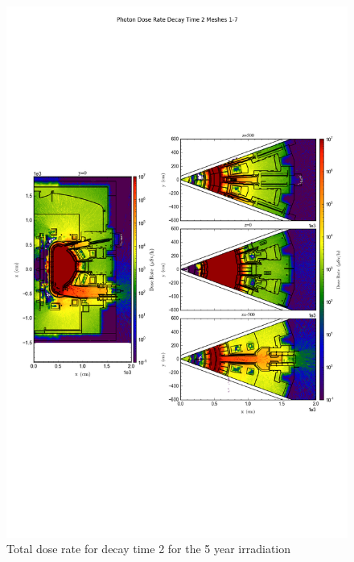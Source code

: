 \documentclass[12pt]{article}
\begin{document}
\begin{figure}[ht!]
\centering
\includegraphics[trim={0cm 8cm, 0cm 8cm},clip,scale=0.75]{../plots/final_model/5year/Photon_Dose_Rate_Decay_Time_2_Meshes_1-7.png}
\caption{Total dose rate for decay time 2 for the 5 year irradiation}
\label{fig:photons_5y_dc2_nob4c_dose}
\end{figure}
\end{document}
